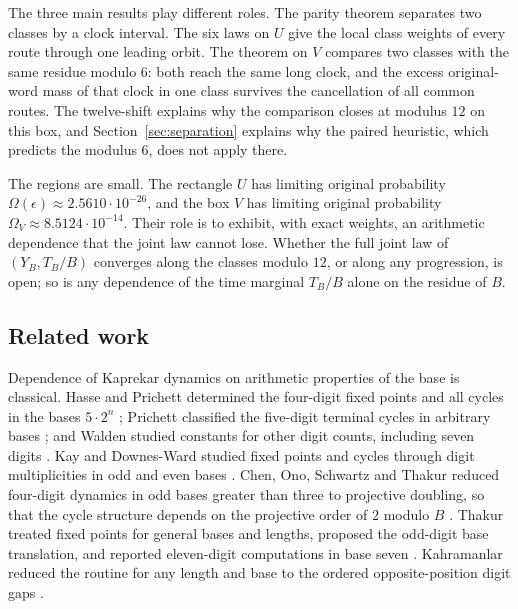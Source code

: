 \documentclass[11pt,reqno]{amsart}
\theoremstyle{remark}
\begin{document}
The three main results play different roles. The parity theorem separates two classes by a clock interval. The six laws on \(U\) give the local class weights of every route through one leading orbit. The theorem on \(V\) compares two classes with the same residue modulo \(6\): both reach the same long clock, and the excess original-word mass of that clock in one class survives the cancellation of all common routes. The twelve-shift explains why the comparison closes at modulus \(12\) on this box, and Section~\ref{sec:separation} explains why the paired heuristic, which predicts the modulus \(6\), does not apply there.

The regions are small. The rectangle \(U\) has limiting original probability \(\Omega(\epsilon)\approx2.5610\cdot10^{-26}\), and the box \(V\) has limiting original probability \(\Omega_V\approx8.5124\cdot10^{-14}\). Their role is to exhibit, with exact weights, an arithmetic dependence that the joint law cannot lose. Whether the full joint law of \((Y_B,T_B/B)\) converges along the classes modulo \(12\), or along any progression, is open; so is any dependence of the time marginal \(T_B/B\) alone on the residue of \(B\).

\subsection*{Related work}
Dependence of Kaprekar dynamics on arithmetic properties of the base is classical. Hasse and Prichett determined the four-digit fixed points and all cycles in the bases \(5\cdot2^n\) \cite[Theorem~4.1]{HP}; Prichett classified the five-digit terminal cycles in arbitrary bases \cite[Sections~1--4]{Pri}; and Walden studied constants for other digit counts, including seven digits \cite{Wa}. Kay and Downes-Ward studied fixed points and cycles through digit multiplicities in odd and even bases \cite{KDO,KDE}. Chen, Ono, Schwartz and Thakur reduced four-digit dynamics in odd bases greater than three to projective doubling, so that the cycle structure depends on the projective order of \(2\) modulo \(B\) \cite[Theorem~1]{COST}. Thakur treated fixed points for general bases and lengths, proposed the odd-digit base translation, and reported eleven-digit computations in base seven \cite[Remark~4.3 and \S5.4]{Thakur}. Kahramanlar reduced the routine for any length and base to the ordered opposite-position digit gaps \cite[\S2]{Kah}.
\end{document}
